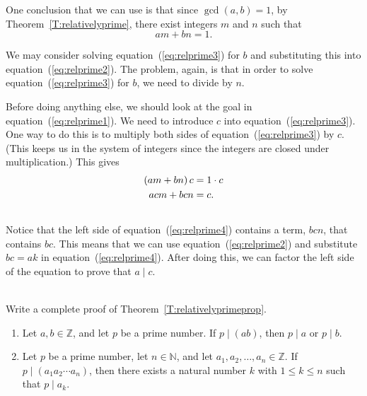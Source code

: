 One conclusion that we can use is that since  $\gcd( {a, b} ) = 1$, by Theorem~\ref{T:relativelyprime}, there exist integers  $m$  and  $n$  such that
\begin{equation} \label{eq:relprime3}
am + bn = 1.
\end{equation}

We may consider solving equation~(\ref{eq:relprime3}) for  $b$  and substituting this into equation~(\ref{eq:relprime2}).  The problem, again, is that in order to solve equation~(\ref{eq:relprime3}) for  $b$, we need to divide by  $n$.  

Before doing anything else, we should look at the goal in equation~(\ref{eq:relprime1}).  We need to introduce  $c$  into equation~(\ref{eq:relprime3}).  One way to do this is to multiply both sides of equation~(\ref{eq:relprime3}) by  $c$.  (This keeps us in the system of integers since the integers are closed under multiplication.)  This gives
\begin{align} \notag
  \left( {am + bn} \right)c &= 1 \cdot c \\ \label{eq:relprime4}
                  acm + bcn &= c. \\ \notag
\end{align} 
Notice that the left side of equation~(\ref{eq:relprime4}) contains a term,  $bcn$, that contains  $bc$.  This means that we can use equation~(\ref{eq:relprime2}) and substitute  
$bc = ak$  in equation~(\ref{eq:relprime4}).  After doing this, we can factor the left side of the equation to prove that  $a \mid c$.
%
\hbreak
%
\begin{prog} 
\label{prog:relativelyprimeprop} \hfill \\
Write a complete proof of Theorem~\ref{T:relativelyprimeprop}.
\end{prog}
\hbreak
%
\begin{corollary}\label{C:primedivides} \hfill
\begin{enumerate}
\item Let  $a, b \in \mathbb{Z}$, and let  $p$  be a prime number.  If  
$p \mid \left( {ab} \right)$, then  $p \mid a$  or  $p \mid b$.  \label{C:primedivides1}

\item Let  $p$  be a prime number, let  $n \in \mathbb{N}$, and let  
$a_1 ,a_2 , \ldots , a_n  \in \mathbb{Z}$.  If  \linebreak
$p \mid \left( {a_1 a_2  \cdots a_n } \right)$, then there exists a natural number $k$ 
 with  $1 \leq k \leq n$ such that  $p \mid a_k $.  \label{C:primedivides2}
\end{enumerate}
\end{corollary}

